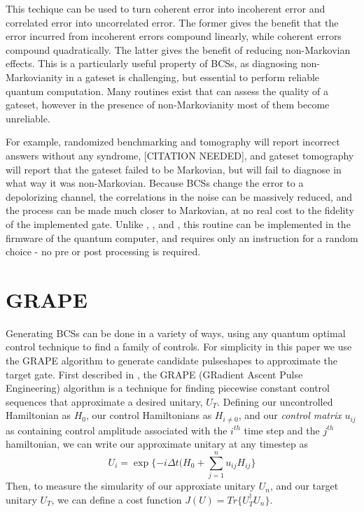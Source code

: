 \documentclass[aps,nofootinbib,pra,notitlepage,twocolumn]{revtex4-1}
\begin{document}
This techique can be used to turn coherent error into incoherent error and correlated error into uncorrelated error. The former gives the benefit that the error incurred from incoherent errors compound linearly, while coherent errors compound quadratically. The latter gives the benefit of reducing non-Markovian effects. This is a particularly useful property of BCSs, as diagnosing non-Markovianity in a gateset is challenging, but essential to perform reliable quantum computation. Many routines exist that can assess the quality of a gateset, however in the presence of non-Markovianity most of them become unreliable.

For example, randomized benchmarking and tomography will report incorrect answers without any syndrome, [CITATION NEEDED], and gateset tomography will report that the gateset failed to be Markovian, but will fail to diagnose in what way it was non-Markovian. Because BCSs change the error to a depolorizing channel, the correlations in the noise can be massively reduced, and the process can be made much closer to Markovian, at no real cost to the fidelity of the implemented gate. Unlike \cite{Ware2018}, \cite{Wallman2016}, and \citep{Campbell2017}, this routine can be implemented in the firmware of the quantum computer, and requires only an instruction for a random choice - no pre or post processing is required.

\section{GRAPE}\label{GRAPE}
Generating BCSs can be done in a variety of ways, using any quantum optimal control technique \cite{Caneva2011, Machnes2018} to find a family of controls. For simplicity in this paper we use the GRAPE algorithm to generate candidate pulseshapes to approximate the target gate. First described in \cite{Khaneja2005}, the GRAPE (GRadient Ascent Pulse Engineering) algorithm is a technique for finding piecewise constant control sequences that approximate a desired unitary, $U_T$. Defining our uncontrolled Hamiltonian as $H_0$, our control Hamiltonians as $H_{i\neq 0}$, and our \textit{control matrix} $u_{ij}$ as containing control amplitude associated with the $i^{th}$ time step and the $j^{th}$ hamiltonian, we can write our approximate unitary at any timestep as
\begin{equation}\label{eq:3}
  U_i = \exp\{-i\Delta t(H_0 + \sum_{j=1}^{n}u_{ij}H_{ij}\}
\end{equation}
Then, to measure the simularity of our approxiate unitary $U_n$, and our target unitary $U_T$, we can define a cost function $J(U) = Tr\{U_T^{\dagger}U_n\}$.
\end{document}
